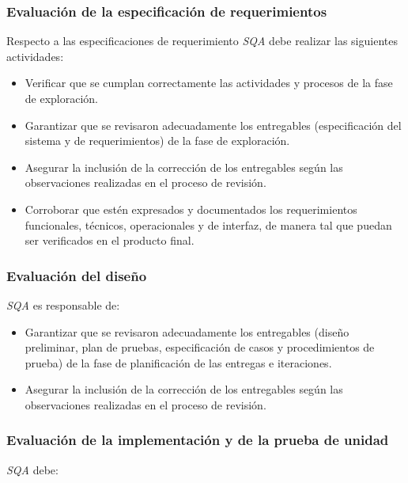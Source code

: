 \subsubsection{Evaluación de la especificación de requerimientos}

Respecto a las especificaciones de requerimiento \textit{SQA} debe realizar las siguientes actividades:

	\begin{itemize}
		\item 
		Verificar que se cumplan correctamente las actividades y procesos de la fase de exploración.
		\item
		Garantizar que se revisaron adecuadamente los entregables (especificación del sistema y de requerimientos) de la fase de exploración. 
		\item
		Asegurar la inclusión de la corrección de los entregables según las observaciones realizadas en el proceso de revisión. 
		\item
		Corroborar que estén expresados y documentados los requerimientos funcionales, técnicos, operacionales y de interfaz, de manera tal que puedan ser verificados en el producto final.
	\end{itemize}

\subsubsection{Evaluación del diseño}

\textit{SQA} es responsable de:

	\begin{itemize}
		\item 
		Garantizar que se revisaron adecuadamente los entregables (diseño preliminar, plan de pruebas, especificación de casos y procedimientos de prueba) de la fase de planificación de las entregas e iteraciones.
		\item
		Asegurar la inclusión de la corrección de los entregables según las observaciones realizadas en el proceso de revisión.
	\end{itemize}
	
\subsubsection{Evaluación de la implementación y de la prueba de unidad}

\textit{SQA} debe:

